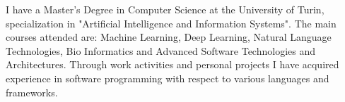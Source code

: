 \par{
   I have a Master's Degree in Computer Science at the University of Turin, specialization in "Artificial Intelligence and Information Systems". The main courses attended are: Machine Learning, Deep Learning, Natural Language Technologies, Bio Informatics and Advanced Software Technologies and Architectures.
Through work activities and personal projects I have acquired experience in software programming with respect to various languages and frameworks.

}
\smallskip